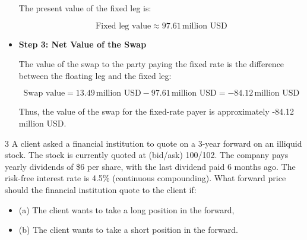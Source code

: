\documentclass[12pt,letterpaper, onecolumn]{exam}
\begin{document}
\begin{solution}
\begin{itemize}
    The present value of the fixed leg is:
    
    \[
    \text{Fixed leg value} \approx 97.61 \, \text{million USD}
    \]
    
    \item \textbf{Step 3: Net Value of the Swap}
    
    The value of the swap to the party paying the fixed rate is the difference between the floating leg and the fixed leg:
    
    \[
    \text{Swap value} = 13.49 \, \text{million USD} - 97.61 \, \text{million USD} = -84.12 \, \text{million USD}
    \]
    
    Thus, the value of the swap for the fixed-rate payer is approximately -84.12 million USD.
    
\end{itemize}

\end{solution}


\newpage

\begin{question} 3
A client asked a financial institution to quote on a 3-year forward on an illiquid stock. The stock is currently quoted at (bid/ask) 100/102. The company pays yearly dividends of \$6 per share, with the last dividend paid 6 months ago. The risk-free interest rate is 4.5\% (continuous compounding). What forward price should the financial institution quote to the client if:
\begin{itemize}
    \item (a) The client wants to take a long position in the forward,
    \item (b) The client wants to take a short position in the forward.
\end{itemize}
\end{question}
\end{document}
